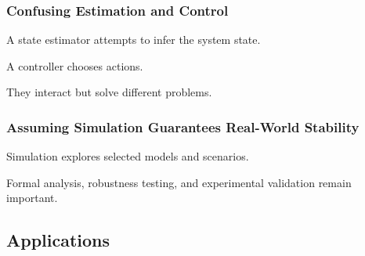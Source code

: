 \subsubsection{Confusing Estimation and Control}

A state estimator attempts to infer the system state.

A controller chooses actions.

They interact but solve different problems.

\subsubsection{Assuming Simulation Guarantees Real-World Stability}

Simulation explores selected models and scenarios.

Formal analysis, robustness testing, and experimental validation remain
important.

\subsection{Applications}
\label{subsec:control-theory-applications}


